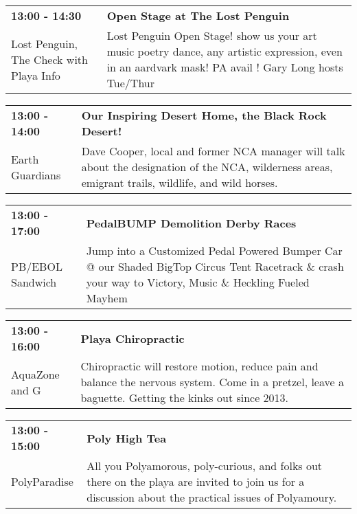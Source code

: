 \begin{tabular}{ p{1in} p{2.2in} }
    \textbf{13:00 - 14:30} & \textbf{Open Stage at The Lost Penguin} \\
    Lost Penguin, The \newline  Check with Playa Info & Lost Penguin Open Stage! show us your art music poetry dance, any artistic expression, even in an aardvark mask! PA avail !  Gary Long hosts Tue/Thur \\
    \hline 
\end{tabular}
    
\begin{tabular}{ p{1in} p{2.2in} }
    \textbf{13:00 - 14:00} & \textbf{Our Inspiring Desert Home, the Black Rock Desert! } \\
    Earth Guardians \newline  & Dave Cooper, local and former NCA manager will talk about the designation of the NCA, wilderness areas, emigrant trails, wildlife, and wild horses. \\
    \hline 
\end{tabular}
    
\begin{tabular}{ p{1in} p{2.2in} }
    \textbf{13:00 - 17:00} & \textbf{PedalBUMP Demolition Derby Races} \\
    PB/EBOL Sandwich \newline  & Jump into a Customized Pedal Powered Bumper Car @ our Shaded BigTop Circus Tent Racetrack \& crash your way to Victory, Music \& Heckling Fueled Mayhem \\
    \hline 
\end{tabular}
    
\begin{tabular}{ p{1in} p{2.2in} }
    \textbf{13:00 - 16:00} & \textbf{Playa Chiropractic} \\
    AquaZone \newline 3 and G & Chiropractic will restore motion, reduce pain and balance the nervous system.  Come in a pretzel, leave a baguette. Getting the kinks out since 2013. \\
    \hline 
\end{tabular}
    
\begin{tabular}{ p{1in} p{2.2in} }
    \textbf{13:00 - 15:00} & \textbf{Poly High Tea} \\
    PolyParadise \newline  & All you Polyamorous, poly-curious, and folks out there on the playa are invited to join us for a discussion about the practical issues of Polyamoury. \\
    \hline 
\end{tabular}
    
